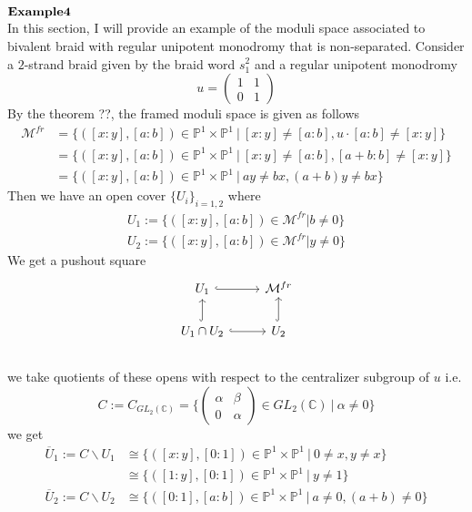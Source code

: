 \begin{example}
\\
$\bf{Example4}$\\
In this section, I will provide an example of the moduli space associated to bivalent braid with regular unipotent monodromy that is non-separated. Consider a $2$-strand braid given by the braid word $s_1^2$ and a regular unipotent monodromy
\[
	u=
	\begin{pmatrix}
		1&1\\
		0&1
	\end{pmatrix}
\] 
By the theorem ??, the framed moduli space is given as follows
\begin{align*}
	\mathcal{M}^{fr}&=\{([x:y],[a:b])\in\mathbb{P}^1\times\mathbb{P}^1~|~[x:y]\neq [a:b],u\cdot[a:b]\neq [x:y]\}\\
	&=\{([x:y],[a:b])\in\mathbb{P}^1\times\mathbb{P}^1~|~[x:y]\neq [a:b],[a+b:b]\neq [x:y]\}\\
	&=\{([x:y],[a:b])\in\mathbb{P}^1\times\mathbb{P}^1~|~ay\neq bx,(a+b)y\neq bx\}
\end{align*}
Then we have an open cover $\{U_i\}_{i=1,2}$ where
\begin{align*}
	U_1:=\{([x:y],[a:b])\in\mathcal{M}^{fr}|b\neq 0\}\\
	U_2:=\{([x:y],[a:b])\in\mathcal{M}^{fr}|y\neq 0\}
\end{align*}
We get a pushout square
\begin{displaymath}
\begin{tikzcd}
	U_1
  \arrow[hookrightarrow]{r} & \mathcal{M}^{fr} \\
	U_1\cap U_2 
  \arrow[hookrightarrow]{u} \arrow[hookrightarrow]{r} 
  & U_2
  \arrow[hookrightarrow]{u} 
\end{tikzcd} 
\end{displaymath}\\
we take quotients of these opens with respect to the centralizer subgroup of $u$ i.e.
\[
	C:=C_{GL_2(\mathbb{C})}
	=\{
		\begin{pmatrix}
			\alpha&\beta\\
			0&\alpha	
		\end{pmatrix}\in GL_{2}(\mathbb{C})
		~|~\alpha\neq 0		
	\}
\]
we get
\begin{align*}
	\overline{U}_1:=C\backslash U_1&\cong\{([x:y],[0:1])\in\mathbb{P}^1\times\mathbb{P}^1~|~0\neq x,y\neq x\}\\
	&\cong\{([1:y],[0:1])\in\mathbb{P}^1\times\mathbb{P}^1~|~y\neq 1\}\\
	\overline{U}_2:=C\backslash U_2&\cong\{([0:1],[a:b])\in\mathbb{P}^1\times\mathbb{P}^1~|~a\neq 0,(a+b)\neq 0\}\\

\end{align*}
\end{example}
